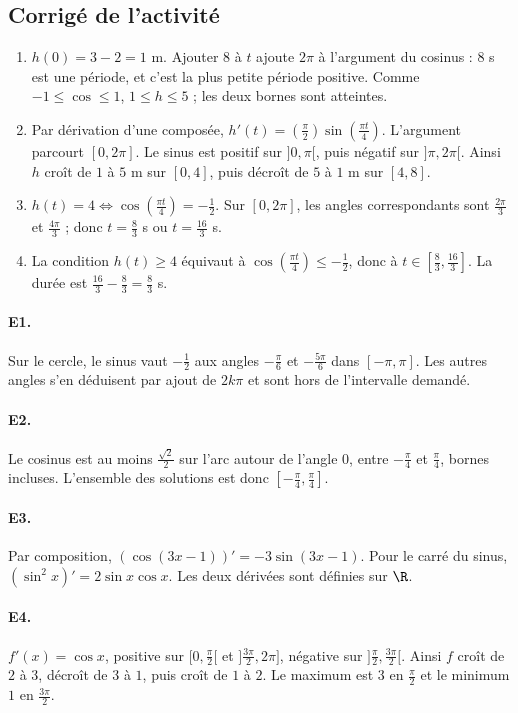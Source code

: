 \subsection{Corrigé de l'activité}\begin{enumerate}
\item $h(0)=3-2=1$ m. Ajouter $8$ à $t$ ajoute $2\pi$ à l'argument du cosinus : $8$ s est une période, et c'est la plus petite période positive. Comme $-1\le\cos\le1$, $1\le h\le5$ ; les deux bornes sont atteintes.
\item Par dérivation d'une composée, $h'(t)=(\frac{\pi}{2})\sin (\frac{\pi t}{4})$. L'argument parcourt $[0,2\pi]$. Le sinus est positif sur $]0,\pi[$, puis négatif sur $]\pi,2\pi[$. Ainsi $h$ croît de $1$ à $5$ m sur $[0,4]$, puis décroît de $5$ à $1$ m sur $[4,8]$.
\item $h(t)=4\Longleftrightarrow\cos (\frac{\pi t}{4})=-\frac{1}{2}$. Sur $[0,2\pi]$, les angles correspondants sont $\frac{2\pi}{3}$ et $\frac{4\pi}{3}$ ; donc $t=\frac{8}{3}$ s ou $t=\frac{16}{3}$ s.
\item La condition $h(t)\ge4$ équivaut à $\cos (\frac{\pi t}{4})\le-\frac{1}{2}$, donc à $t\in[\frac{8}{3},\frac{16}{3}]$. La durée est $\frac{16}{3}-\frac{8}{3}=\frac{8}{3}$ s.
\end{enumerate}

\paragraph{E1.}Sur le cercle, le sinus vaut $-\frac{1}{2}$ aux angles $-\frac{\pi}{6}$ et $-\frac{5\pi}{6}$ dans $[-\pi,\pi]$. Les autres angles s'en déduisent par ajout de $2k\pi$ et sont hors de l'intervalle demandé.

\paragraph{E2.}Le cosinus est au moins $\frac{\sqrt{2}}{2}$ sur l'arc autour de l'angle $0$, entre $-\frac{\pi}{4}$ et $\frac{\pi}{4}$, bornes incluses. L'ensemble des solutions est donc $[-\frac{\pi}{4},\frac{\pi}{4}]$.

\paragraph{E3.}Par composition, $(\cos(3x-1))'=-3\sin(3x-1)$. Pour le carré du sinus, $(\sin^2x)'=2\sin x\cos x$. Les deux dérivées sont définies sur $\R$.

\paragraph{E4.}$f'(x)=\cos x$, positive sur $[0,\frac{\pi}{2}[$ et $]\frac{3\pi}{2},2\pi]$, négative sur $]\frac{\pi}{2},\frac{3\pi}{2}[$. Ainsi $f$ croît de $2$ à $3$, décroît de $3$ à $1$, puis croît de $1$ à $2$. Le maximum est $3$ en $\frac{\pi}{2}$ et le minimum $1$ en $\frac{3\pi}{2}$.


